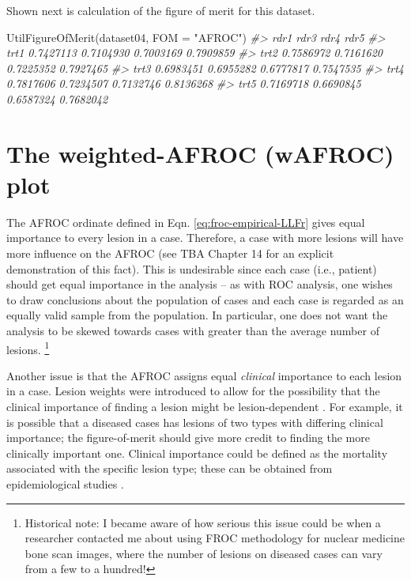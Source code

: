 \documentclass[
]{book}
\newenvironment{Shaded}{\begin{snugshade}}{\end{snugshade}}
\newcommand{\AttributeTok}[1]{\textcolor[rgb]{0.77,0.63,0.00}{#1}}
\newcommand{\CommentTok}[1]{\textcolor[rgb]{0.56,0.35,0.01}{\textit{#1}}}
\newcommand{\FunctionTok}[1]{\textcolor[rgb]{0.00,0.00,0.00}{#1}}
\newcommand{\NormalTok}[1]{#1}
\newcommand{\StringTok}[1]{\textcolor[rgb]{0.31,0.60,0.02}{#1}}
\begin{document}
Shown next is calculation of the figure of merit for this dataset.

\begin{Shaded}
\begin{Highlighting}[]
\FunctionTok{UtilFigureOfMerit}\NormalTok{(dataset04, }\AttributeTok{FOM =} \StringTok{"AFROC"}\NormalTok{)}
\CommentTok{\#\textgreater{}           rdr1      rdr3      rdr4      rdr5}
\CommentTok{\#\textgreater{} trt1 0.7427113 0.7104930 0.7003169 0.7909859}
\CommentTok{\#\textgreater{} trt2 0.7586972 0.7161620 0.7225352 0.7927465}
\CommentTok{\#\textgreater{} trt3 0.6983451 0.6955282 0.6777817 0.7547535}
\CommentTok{\#\textgreater{} trt4 0.7817606 0.7234507 0.7132746 0.8136268}
\CommentTok{\#\textgreater{} trt5 0.7169718 0.6690845 0.6587324 0.7682042}
\end{Highlighting}
\end{Shaded}

\hypertarget{froc-empirical-wAFROC}{%
\section{The weighted-AFROC (wAFROC) plot}\label{froc-empirical-wAFROC}}

The AFROC ordinate defined in Eqn. \eqref{eq:froc-empirical-LLFr} gives equal importance to every lesion in a case. Therefore, a case with more lesions will have more influence on the AFROC (see TBA Chapter 14 for an explicit demonstration of this fact). This is undesirable since each case (i.e., patient) should get equal importance in the analysis -- as with ROC analysis, one wishes to draw conclusions about the population of cases and each case is regarded as an equally valid sample from the population. In particular, one does not want the analysis to be skewed towards cases with greater than the average number of lesions. \footnote{Historical note: I became aware of how serious this issue could be when a researcher contacted me about using FROC methodology for nuclear medicine bone scan images, where the number of lesions on diseased cases can vary from a few to a hundred!}

Another issue is that the AFROC assigns equal \emph{clinical} importance to each lesion in a case. Lesion weights were introduced \citep{RN1385} to allow for the possibility that the clinical importance of finding a lesion might be lesion-dependent \citep{RN1966}. For example, it is possible that a diseased cases has lesions of two types with differing clinical importance; the figure-of-merit should give more credit to finding the more clinically important one. Clinical importance could be defined as the mortality associated with the specific lesion type; these can be obtained from epidemiological studies \citep{desantis2011breast}.
\end{document}
